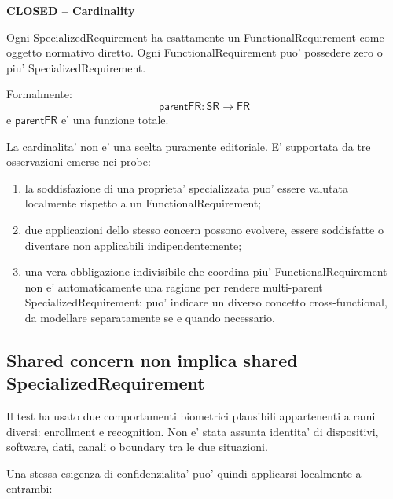 \documentclass[11pt,a4paper]{article}
\newcommand{\FR}{\mathsf{FR}}
\newcommand{\SR}{\mathsf{SR}}
\newcommand{\parent}{\mathsf{parentFR}}
\newcommand{\closed}{\textbf{CLOSED}}
\newenvironment{statusbox}[1]{%
  \def\FrameCommand{\fcolorbox{ddtablue}{ddtagray}}%
  \MakeFramed{\advance\hsize-2\width\FrameRestore}
  \noindent\textbf{#1}\par\smallskip
}{\endMakeFramed}
\begin{document}
\begin{statusbox}{\closed{} -- Cardinality}
Ogni SpecializedRequirement ha esattamente un FunctionalRequirement come oggetto normativo diretto. Ogni FunctionalRequirement puo' possedere zero o piu' SpecializedRequirement.
\end{statusbox}

Formalmente:
\[
  \parent : \SR \rightarrow \FR
\]
e $\parent$ e' una funzione totale.

La cardinalita' non e' una scelta puramente editoriale. E' supportata da tre osservazioni emerse nei probe:
\begin{enumerate}
  \item la soddisfazione di una proprieta' specializzata puo' essere valutata localmente rispetto a un FunctionalRequirement;
  \item due applicazioni dello stesso concern possono evolvere, essere soddisfatte o diventare non applicabili indipendentemente;
  \item una vera obbligazione indivisibile che coordina piu' FunctionalRequirement non e' automaticamente una ragione per rendere multi-parent SpecializedRequirement: puo' indicare un diverso concetto cross-functional, da modellare separatamente se e quando necessario.
\end{enumerate}

\subsection{Shared concern non implica shared SpecializedRequirement}

Il test ha usato due comportamenti biometrici plausibili appartenenti a rami diversi: enrollment e recognition. Non e' stata assunta identita' di dispositivi, software, dati, canali o boundary tra le due situazioni.

Una stessa esigenza di confidenzialita' puo' quindi applicarsi localmente a entrambi:

\begin{center}
\end{center}
\end{document}
